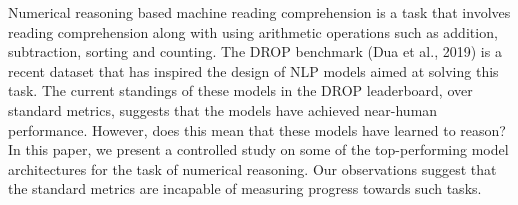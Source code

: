 Numerical reasoning based machine reading comprehension is a task that involves reading comprehension along with using arithmetic operations such as addition, subtraction, sorting and counting. The DROP benchmark  (Dua et al., 2019) is a recent dataset that has inspired the design of NLP models aimed at solving this task. The current standings of these models in the DROP leaderboard, over standard metrics, suggests that the models have achieved near-human performance. However, does this mean that these models have learned to reason? In this paper, we present a controlled study on some of the top-performing model architectures for the task of numerical reasoning. Our observations suggest that the standard metrics are incapable of measuring progress towards such tasks.
